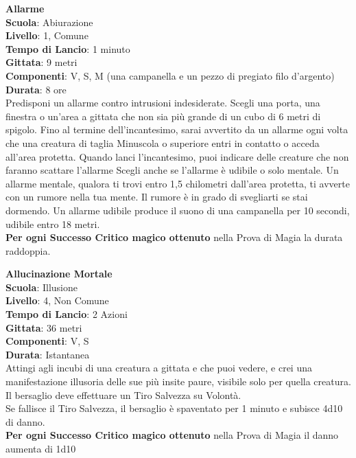 \begin{multicols}{2}
\medskip\textbf{Allarme}\\
\textbf{Scuola}: Abiurazione\\
\textbf{Livello}: 1, Comune\\
\textbf{Tempo di Lancio}: 1 minuto\\
\textbf{Gittata}: 9 metri\\
\textbf{Componenti}: V, S, M (una campanella e un pezzo di pregiato filo d'argento)\\
\textbf{Durata}: 8 ore\\
Predisponi un allarme contro intrusioni indesiderate. Scegli una porta, una finestra o un'area a gittata che non sia più grande di un cubo di 6 metri di spigolo. Fino al termine dell'incantesimo, sarai avvertito da un allarme ogni volta che una creatura di taglia Minuscola o superiore entri in contatto o acceda all'area protetta. Quando lanci l'incantesimo, puoi indicare delle creature che non faranno scattare l'allarme Scegli anche se l'allarme è udibile o solo mentale. Un allarme mentale, qualora ti trovi entro 1,5 chilometri dall'area protetta, ti avverte con un rumore nella tua mente. Il rumore è in grado di svegliarti se stai dormendo. Un allarme udibile produce il suono di una campanella per 10 secondi, udibile entro 18 metri.\\
\textbf{Per ogni Successo Critico magico ottenuto} nella Prova di Magia la durata raddoppia.

\medskip\textbf{Allucinazione Mortale}\\
\textbf{Scuola}: Illusione\\
\textbf{Livello}: 4, Non Comune\\
\textbf{Tempo di Lancio}: 2 Azioni\\
\textbf{Gittata}: 36 metri\\
\textbf{Componenti}: V, S\\
\textbf{Durata}: Istantanea\\
Attingi agli incubi di una creatura a gittata e che puoi vedere, e crei una manifestazione illusoria delle sue più insite paure, visibile solo per quella creatura. Il bersaglio deve effettuare un Tiro Salvezza su Volontà.\\
Se fallisce il Tiro Salvezza, il bersaglio è spaventato per 1 minuto e subisce 4d10 di danno. \\
\textbf{Per ogni Successo Critico magico ottenuto} nella Prova di Magia il danno aumenta di 1d10


\end{multicols}
